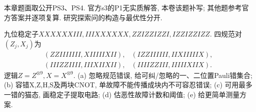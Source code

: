 本章题面取公开PS3、PS4. 官方s3的P1无实质解答, 本卷该题补写; 其他题参考官方答案并逐项复算. 研究探索问的构造与最优性分开.
\begin{exercise}九位稳定子$XXXXXXIII,IIIXXXXXX,ZZIZZIZZI,IZZIZZIZZ$. 四规范对$(Z_j,X_j)$为
\[\begin{array}{ll}
(ZZIIIIIII,XIIIIIXII),&(IZZIIIIII,IIXIIIIIX),\\
(IIIZZIIII,IIIXIIXII),&(IIIIZZIII,IIIIIXIIX).
\end{array}\] 逻辑$Z=Z^{\otimes9},X=X^{\otimes9}$. (a) 忽略规范错误, 给可纠/忽略的一、二位置Pauli错集合; (b) 容错X,Z,H,S及两块CNOT, 单故障不能传播成块内不可容忍错误; (c) 可用最多一错的猫态, 画稳定子提取电路; (d) 估恶性故障计数和阈值; (e) 给更简单测量方案.\end{exercise}
